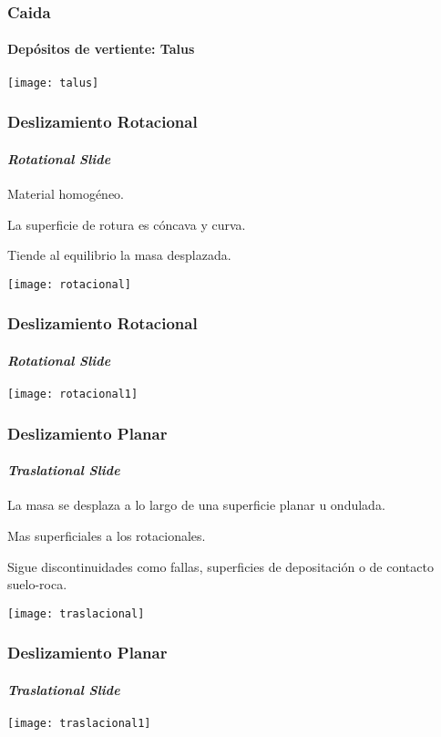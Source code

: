 \documentclass{beamer}
\begin{document}
\begin{frame}
\frametitle{Caida}
\framesubtitle{Depósitos de vertiente: Talus}
\begin{center}
   	\texttt{[image: talus]} 
\end{center}
\end{frame}
\begin{frame}
\frametitle{Deslizamiento Rotacional}
\framesubtitle{\it{Rotational Slide}}
\begin{itemize}
\small{
\item Material homogéneo.
\item La superficie de rotura es cóncava y curva.
\item Tiende al equilibrio la masa desplazada.
}
\end{itemize}
\begin{center}
   	\texttt{[image: rotacional]} 
\end{center}
\end{frame}
\begin{frame}
\frametitle{Deslizamiento Rotacional}
\framesubtitle{\it{Rotational Slide}}
\begin{center}
   	\texttt{[image: rotacional1]} 
\end{center}
\end{frame}
\begin{frame}
\frametitle{Deslizamiento Planar}
\framesubtitle{\it{Traslational Slide}}
\begin{itemize}
\small{
\item La masa se desplaza a lo largo de una superficie planar u ondulada.
\item Mas superficiales a los rotacionales.
\item Sigue discontinuidades como fallas, superficies de depositación o de contacto suelo-roca.
}
\end{itemize}
\begin{center}
   	\texttt{[image: traslacional]} 
\end{center}
\end{frame}
\begin{frame}
\frametitle{Deslizamiento Planar}
\framesubtitle{\it{Traslational Slide}}
\begin{center}
   	\texttt{[image: traslacional1]} 
\end{center}
\end{frame}
\end{document}
